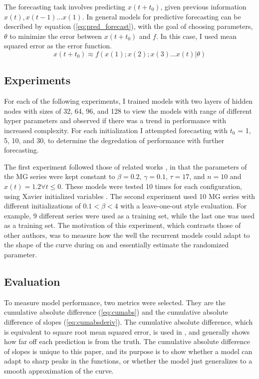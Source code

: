 \documentclass[11pt]{article}
\begin{document}
The forecasting task involves predicting $x(t+t_0)$, given previous
information $x(t), x(t-1) ... x(1)$. In general models for predictive forecasting
can be described by equation (\ref{eq:pred_forecast}), with the goal of
choosing parameters, $\theta$ to minimize the error between $x(t+t_0)$
and $f$. In this case, I used mean squared error as the error function.
\begin{equation}
  x(t+t_0) \approx f(x(1);x(2);x(3)...x(t) | \theta)
  \label{eq:pred_forecast}
\end{equation}

\subsection{Experiments}
For each of the following
experiments, I
trained models with two layers of hidden nodes with sizes of 32, 64, 96, and 128 to
view the models with range of different hyper parameters and observed if
there was a trend in performance with increased complexity. For each
initialization I attempted forecasting with $t_0$ = 1, 5, 10, and 30,
to determine the degredation of performance with further forecasting.

The first experiment followed those of related works \cite{tr, Farsa}, in that the
parameters of the MG series were kept constant to $\beta = 0.2$,
$\gamma = 0.1$, $\tau = 17$, and $n = 10$ and $x(t)=1.2 \forall t \leq 0$. These models were tested 10 times for each configuration, using Xavier initialized variables \cite{Xavier}. The second experiment used 10 MG series with different
initializations of $0.1 < \beta < 4$ with a leave-one-out style
evaluation. For example, 9 different series were used as a training
set, while the last one was used as a training set. The motivation of
this experiment, which contrasts those of other authors, was to measure
how the well the recurrent models could adapt to the shape of the curve during
on and essentially estimate the randomized parameter.

\subsection{Evaluation}
To measure model performance, two metrics were selected. They are
the cumulative absolute difference (\ref{eq:cumabs}) and the
cumulative absolute difference of slopes
(\ref{eq:cumabsderiv}). The cumulative absolute difference, which is
equivalent to square root mean squared error, is used 
in \cite{Farsa}, and generally shows how far off each prediction
is from the truth. The cumulative absolute difference of slopes is
unique to this paper, and its purpose is to show whether a model can
adapt to sharp peaks in the functions, or whether the model just
generalizes to a smooth approximation of the curve.
\end{document}
